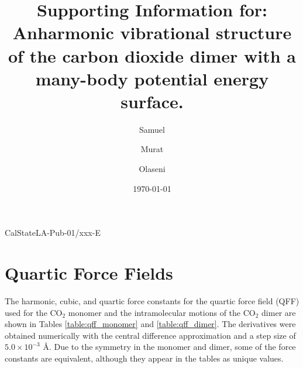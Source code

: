 \documentclass[aip,jcp,showpacs,superscriptaddress,groupedaddress]{revtex4-1}  %
\begin{document}
\newcommand*{\citen}[1]{%
  \begingroup
    \romannumeral-`\x %
    \setcitestyle{numbers}%
    \cite{#1}%
  \endgroup   
}
\newcommand\Tstrut{\rule{0pt}{2.6ex}}         %
\newcommand\Bstrut{\rule[-1.5ex]{0pt}{0pt}}   %

\hspace{5.2in} \mbox{CalStateLA-Pub-01/xxx-E}

\title{Supporting Information for: Anharmonic vibrational structure of the carbon dioxide dimer with a many-body potential energy surface.}

\author{Samuel }
\author{Murat }
\author{Olaseni }

\date{\today}


\pacs{}

\maketitle

\section[S1]{Quartic Force Fields}
The harmonic, cubic, and quartic force constants for the quartic force field (QFF) used for the CO$_2$ monomer and the intramolecular motions of the CO$_2$ dimer are shown in Tables \ref{table:qff_monomer} and \ref{table:qff_dimer}. The derivatives were obtained numerically with the central difference approximation and a step size of $5.0 \times10^{-3}$ \AA. Due to the symmetry in the monomer and dimer, some of the force constants are equivalent, although they appear in the tables as unique values. 
\end{document}
